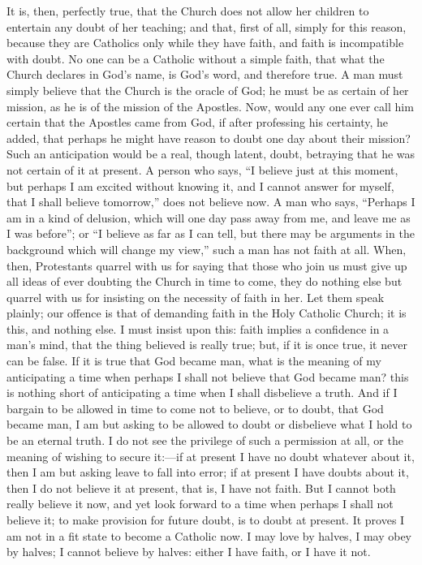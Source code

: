 It is, then, perfectly true, that the Church does not allow her
children to entertain any doubt of her teaching; and that, first of
all, simply for this reason, because they are Catholics only while
they have faith, and faith is incompatible with doubt. No one can be a
Catholic without a simple faith, that what the Church declares in
God's name, is God's word, and therefore true. A man must simply
believe that the Church is the oracle of God; he must be as certain of
her mission, as he is of the mission of the Apostles. Now, would any
one ever call him certain that the Apostles came from God, if after
professing his certainty, he added, that perhaps he might have reason
to doubt one day about their mission? Such an anticipation would be a
real, though latent, doubt, betraying that he was not certain of it at
present. A person who says, ``I believe just at this moment, but
perhaps I am excited without knowing it, and I cannot answer for
myself, that I shall believe tomorrow,'' does not believe now. A
man who says, ``Perhaps I am in a kind of delusion, which will one
day pass away from me, and leave me as I was before''; or ``I
believe as far as I can tell, but there may be arguments in the
background which will change my view,'' such a man has not faith
at all. When, then, Protestants quarrel with us for saying that those
who join us must give up all ideas of ever doubting the Church in time
to come, they do nothing else but quarrel with us for insisting on the
necessity of faith in her. Let them speak plainly; our offence is that
of demanding faith in the Holy Catholic Church; it is this, and
nothing else. I must insist upon this: faith implies a confidence in a
man's mind, that the thing believed is really true; but, if it is once
true, it never can be false. If it is true that God became man, what
is the meaning of my anticipating a time when perhaps I shall not
believe that God became man? this is nothing short of anticipating a
time when I shall disbelieve a truth. And if I bargain to be allowed
in time to come not to believe, or to doubt, that God became man, I am
but asking to be allowed to doubt or disbelieve what I hold to be an
eternal truth. I do not see the privilege of such a permission at all,
or the meaning of wishing to secure it:—if at present I have no
doubt whatever about it, then I am but asking leave to fall into
error; if at present I have doubts about it, then I do not believe it
at present, that is, I have not faith. But I cannot both really
believe it now, and yet look forward to a time when perhaps I shall
not believe it; to make provision for future doubt, is to doubt at
present. It proves I am not in a fit state to become a Catholic now. I
may love by halves, I may obey by halves; I cannot believe by halves:
either I have faith, or I have it not.

